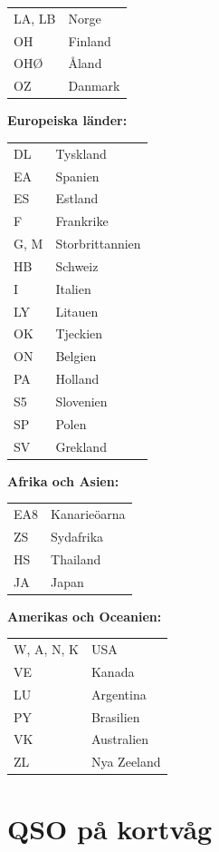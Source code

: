 \begin{tabular}{ll}
  LA, LB & Norge\\
  OH & Finland\\
  OHØ & Åland\\
  OZ & Danmark\\
\end{tabular}

\textbf{Europeiska länder:}

\begin{tabular}{ll}
  DL & Tyskland\\
  EA & Spanien\\
  ES & Estland\\
  F & Frankrike\\
  G, M & Storbrittannien\\
  HB & Schweiz\\
  I & Italien\\
  LY & Litauen\\
  OK & Tjeckien\\
  ON & Belgien\\
  PA & Holland\\
  S5 & Slovenien\\
  SP & Polen\\
  SV & Grekland\\
\end{tabular}

\textbf{Afrika och Asien:}

\begin{tabular}{ll}
  EA8 & Kanarieöarna\\
  ZS & Sydafrika\\
  HS & Thailand\\
  JA & Japan\\
\end{tabular}

\textbf{Amerikas och Oceanien:}
    
\begin{tabular}{ll}
  W, A, N, K & USA\\
  VE & Kanada\\
  LU & Argentina\\
  PY & Brasilien\\
  VK & Australien\\
  ZL & Nya Zeeland\\
\end{tabular}

\newpage

\section{QSO på kortvåg}

